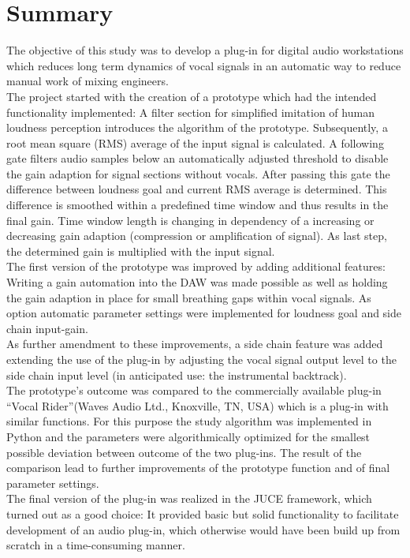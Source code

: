 \chapter{Summary}
\label{chapter:summary}

The objective of this study was to develop a plug-in for digital audio workstations which reduces long term dynamics of vocal signals in an automatic way to reduce manual work of mixing engineers.\\
The project started with the creation of a prototype which had the intended functionality implemented: A filter section for simplified imitation of human loudness perception introduces the algorithm of the prototype. Subsequently, a root mean square (RMS) average of the input signal is calculated. A following gate filters audio samples below an automatically adjusted threshold to disable the gain adaption for signal sections without vocals. After passing this gate the difference between loudness goal and current RMS average is determined. This difference is smoothed within a predefined time window and thus results in the final gain. Time window length is changing in dependency of a increasing or decreasing gain adaption (compression or amplification of signal). As last step, the determined gain is multiplied with the input signal.\\
The first version of the prototype was improved by adding additional features: Writing a gain automation into the DAW was made possible as well as holding the gain adaption in place for small breathing gaps within vocal signals. As option automatic parameter settings were implemented for loudness goal and side chain input-gain.\\
As further amendment to these improvements, a side chain feature was added extending the use of the plug-in by adjusting the vocal signal output level to the side chain input level (in anticipated use: the instrumental backtrack).\\
The prototype's outcome was compared to the commercially available plug-in “Vocal Rider”(Waves Audio Ltd., Knoxville, TN, USA) which is a plug-in with similar functions. For this purpose the study algorithm was implemented in Python and the parameters were algorithmically optimized for the smallest possible deviation between outcome of the two plug-ins. The result of the comparison lead to further improvements of the prototype function and of final parameter settings.\\
The final version of the plug-in was realized in the JUCE framework, which turned out as a good choice: It provided basic but solid functionality to facilitate development of an audio plug-in, which otherwise would have been build up from scratch in a time-consuming manner.\\
